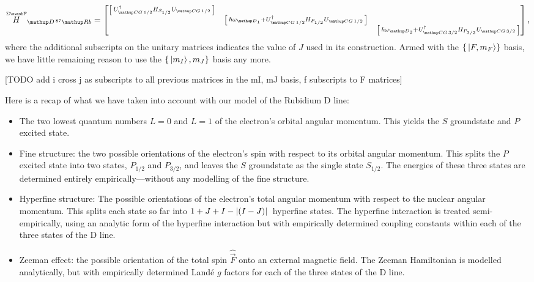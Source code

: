\begin{align}
\overset{\scriptscriptstyle \Sigma\mathcal{F}}{H}_{\up{D}\,^{87}\up{Rb}} = 
\left[\begin{matrix}
    \left[\begin{smallmatrix}
        U^\dagger_{\up{CG}\,1/2} H_{S_{1/2}} U_{\up{CG}\,1/2}\\
    \end{smallmatrix} \right]\\
    & \left[\begin{smallmatrix}
        \hbar\omega_{\up{D}_1}+U^\dagger_{\up{CG}\,1/2}H_{P_{1/2}}U_{\up{CG}\,1/2}\\
      \end{smallmatrix} \right]\\
    & &\left[\begin{smallmatrix}
        \hbar\omega_{\up{D}_2}+U^\dagger_{\up{CG}\,3/2}H_{P_{3/2}}U_{\up{CG}\,3/2}\\
        \end{smallmatrix} \right]\\
\end{matrix} \right],
\end{align}
where the additional subscripts on the unitary matrices indicates the value of $J$ used in its construction. Armed with the $\{\ket{F, m_F}\}$ basis, we have little remaining reason to use the $\{\ket{m_I}, {m_J}\}$ basis any more.

[TODO add i cross j as subscripts to all previous matrices in the mI, mJ basis, f subscripts to F matrices]  


Here is a recap of what we have taken into account with our model of the Rubidium D line:
\begin{itemize}
    \item The two lowest quantum numbers $L=0$ and $L=1$ of the electron's orbital angular momentum. This yields the $S$ groundstate and $P$ excited state.
    \item Fine structure: the two possible orientations of the electron's spin with respect to its orbital angular momentum. This splits the $P$ excited state into two states, $P_{1/2}$ and $P_{3/2}$, and leaves the $S$ groundstate as the single state $S_{1/2}$. The energies of these three states are determined entirely empirically---without any modelling of the fine structure.
    \item Hyperfine structure: The possible orientations of the electron's total angular momentum with respect to the nuclear angular momentum. This splits each state so far into $1+J+I - \abs{(I - J)}$ hyperfine states. The hyperfine interaction is treated semi-empirically, using an analytic form of the hyperfine interaction but with empirically determined coupling constants within each of the three states of the D line. 
    \item Zeeman effect: the possible orientation of the total spin $\hat{\vec F}$ onto an external magnetic field. The Zeeman Hamiltonian is modelled analytically, but with empirically determined Land\'e $g$ factors for each of the three states of the D line. 
\end{itemize}

